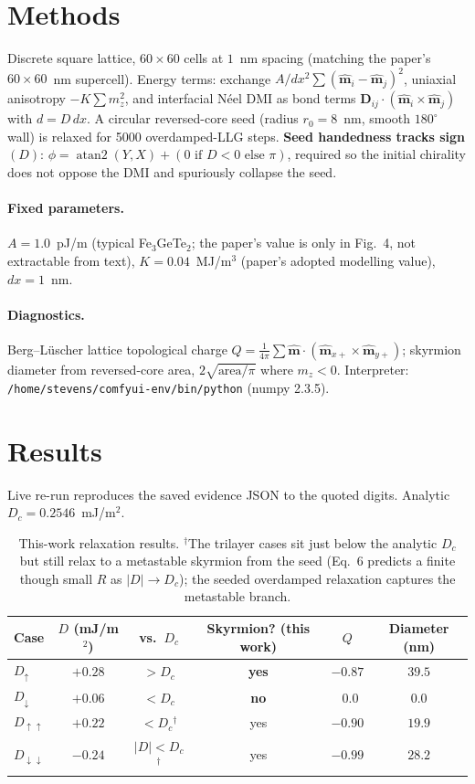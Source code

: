 \documentclass[11pt]{article}
\begin{document}
\section{Methods}
Discrete square lattice, $60\times60$ cells at $1$~nm spacing (matching the
paper's $60\times60$~nm supercell). Energy terms: exchange
$A/dx^2\sum(\hat{\mathbf m}_i-\hat{\mathbf m}_j)^2$, uniaxial anisotropy
$-K\sum m_z^2$, and interfacial N\'eel DMI as bond terms
$\mathbf D_{ij}\cdot(\hat{\mathbf m}_i\times\hat{\mathbf m}_j)$ with $d=D\,dx$.
A circular reversed-core seed (radius $r_0=8$~nm, smooth $180^\circ$ wall) is
relaxed for 5000 overdamped-LLG steps. \textbf{Seed handedness tracks
sign$(D)$}: $\phi=\operatorname{atan2}(Y,X)+(0\text{ if }D<0\text{ else }\pi)$,
required so the initial chirality does not oppose the DMI and spuriously
collapse the seed.

\paragraph{Fixed parameters.} $A=1.0$~pJ/m (typical Fe$_3$GeTe$_2$; the paper's
value is only in Fig.~4, not extractable from text), $K=0.04$~MJ/m$^3$ (paper's
adopted modelling value), $dx=1$~nm.

\paragraph{Diagnostics.} Berg--L\"uscher lattice topological charge
$Q=\tfrac{1}{4\pi}\sum \hat{\mathbf m}\cdot(\hat{\mathbf m}_{x+}\times\hat{\mathbf m}_{y+})$;
skyrmion diameter from reversed-core area, $2\sqrt{\text{area}/\pi}$ where $m_z<0$.
Interpreter: \texttt{/home/stevens/comfyui-env/bin/python} (numpy 2.3.5).

\section{Results}
Live re-run reproduces the saved evidence JSON to the quoted digits.
Analytic $D_c=0.2546$~mJ/m$^2$.

\begin{table}[h]
\centering
\begin{tabular}{lccccc}
\toprule
Case & $D$ (mJ/m$^2$) & vs.\ $D_c$ & Skyrmion? (this work) & $Q$ & Diameter (nm) \\
\midrule
$D_\uparrow$        & $+0.28$ & $>D_c$ & \textbf{yes} & $-0.87$ & $39.5$ \\
$D_\downarrow$      & $+0.06$ & $<D_c$ & \textbf{no}  & $\ \ 0.0$ & $0.0$ \\
$D_{\uparrow\uparrow}$   & $+0.22$ & $<D_c$$^\dagger$ & yes & $-0.90$ & $19.9$ \\
$D_{\downarrow\downarrow}$ & $-0.24$ & $|D|<D_c$$^\dagger$ & yes & $-0.99$ & $28.2$ \\
\bottomrule
\end{tabular}
\caption{This-work relaxation results. $^\dagger$The trilayer cases sit just
below the analytic $D_c$ but still relax to a metastable skyrmion from the
seed (Eq.~6 predicts a finite though small $R$ as $|D|\to D_c$); the seeded
overdamped relaxation captures the metastable branch.}
\end{table}
\end{document}
